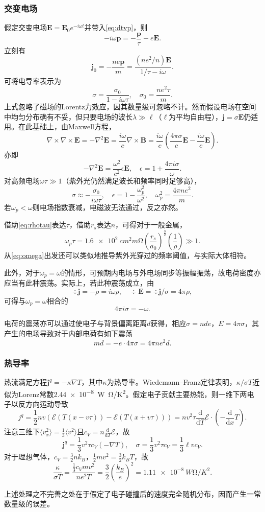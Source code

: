 \documentclass{ctexart}
\newcommand{\edd}[1]{\frac{\mathrm{d}}{\mathrm{d} #1}}
\newcommand{\edT}{\edd{T}}
\newcommand{\edx}{\edd{x}}
\newcommand{\pare}[1]{\left( #1 \right)}
\newcommand{\expc}[1]{\langle#1\rangle}
\newcommand{\lapc}{\nabla^2}
\newcommand{\vE}{\boldsymbol{E}}
\newcommand{\vB}{\boldsymbol{B}}
\newcommand{\vj}{\boldsymbol{j}}
\newcommand{\vp}{\boldsymbol{p}}
\newcommand{\half}{\frac{1}{2}}
\newcommand{\rot}{\nabla\times}
\newcommand{\cE}{\mathcal{E}}
\begin{document}
\subsubsection{交变电场}
假定交变电场$\vE=\vE_0e^{-i\omega t}$并带入\eqref{eq:dtvp}，则
\[ -i\omega\vp=-\frac{\vp}{\tau}-e\vE. \]
立刻有
\[ \vj_0 = -\frac{ne\vp}{m} = \frac{\pare{ne^2/n}\vE}{1/\tau-i\omega}. \]
可将电导率表示为
\[ \sigma = \frac{\sigma_0}{1-i\omega\tau}, \quad \sigma_0 = \frac{ne^2\tau}{m}. \]
上式忽略了磁场的Lorentz力效应，因其数量级可忽略不计。然而假设电场在空间中均匀分布确有不妥，但只要电场的波长$\lambda \gg
 \ell$（$\ell$为平均自由程），$\vj = \sigma \vE$仍适用。在此基础上，由Maxwell方程，
 \[ \rot\rot\vE = -\lapc\vE = \frac{i\omega}{c}\rot\vB = \frac{i\omega}{c}\pare{\frac{4\pi\sigma}{c}\vE-\frac{i\omega}{c}\vE}. \]
 亦即
 \[ -\lapc\vE = \frac{\omega^2}{c^2}\epsilon\vE, \quad \epsilon = 1+\frac{4\pi i \sigma}{\omega}. \]
 对高频电场$\omega\tau\gg 1$（紫外光仍然满足波长和频率同时足够高），
 \begin{equation}
 \label{eq:omega}
 \sigma\approx-\frac{\sigma_0}{i\omega\tau},\quad \epsilon = 1-\frac{\omega_p^2}{\omega^2}, \quad \omega_p^2 = \frac{4\pi ne^2}{m}.
 \end{equation}
 若$\omega_p<\omega$则电场指数衰减，电磁波无法通过，反之亦然。
 \par
 借助\eqref{eq:rhotau}表达$\tau$，借助$r_s$表达$n$，可得对于一般金属，
 \[ \omega_p \tau = \SI{1.6e2}{cm^2 m\ohm}\pare{\frac{r_s}{a_0}}^{\frac{3}{2}}\pare{\frac{1}{\rho}}\gg 1. \]
从\eqref{eq:omega}出发还可以类似地推导紫外光穿过的频率阈值，与实际大体相符。
\par
此外，对于$\omega_p=\omega$的情形，可预期内电场与外电场同步等振幅振荡，故电荷密度亦应当有此种震荡。实际上，若此种震荡成立，由
\[ \div \vj = -\dot{\rho} = i\omega\rho,\quad \div \vE = \div \vj/\sigma = 4\pi\rho, \]
可得与$\omega_p=\omega$相合的
\[ 4\pi i \sigma = -\omega. \]
\par
电荷的震荡亦可以通过使电子与背景偏离距离$d$获得，相应$\sigma=nde$，$E=4\pi\sigma$，其产生的电场导致对于内部电荷有如下震荡
\[ m\ddot{d} = -e\cdot 4\pi\sigma = 4\pi ne^2 d. \]
\subsubsection{热导率}
热流满足方程$\vj^q=-\kappa\nabla T$，其中$\kappa$为热导率。Wiedemann–Franz定律表明，$\kappa/\sigma T$近似为Lorenz常数\SI{2.44e-8}{W \ohm/K^2}。假定电子贡献主要热能，则一维下两电子以反方向运动导致
\[ j^q = \half nv\pare{\cE\pare{T\pare{x-v\tau}} - \cE\pare{T\pare{x+v\tau}}} = nv^2\tau\edT \cE \cdot \pare{-\edx T}. \]
注意三维下$\expc{v_x^2} = \frac{1}{3}\expc{v^2}$且$c_V=n\edT \cE$，故
\[ \vj^q = \frac{1}{3}v^2\tau c_V\pare{-\nabla T}, \quad \sigma = \frac{1}{3}v^2\tau c_V = \frac{1}{3}\ell vc_V. \]
对于理想气体，$c_V=\frac{3}{2}nk_B$，$\half mv^2 = \frac{3}{2}k_BT$，故
\[ \frac{\kappa}{\sigma T} = \frac{\frac{1}{3}c_V mv^2}{ne^2 T} = \frac{3}{2}\pare{\frac{k_B}{e}}^2 = \SI{1.11e-8}{W\ohm/K^2}. \]
\par
上述处理之不完善之处在于假定了电子碰撞后的速度完全随机分布，因而产生一常数量级的误差\cite{concepts}。
\end{document}
